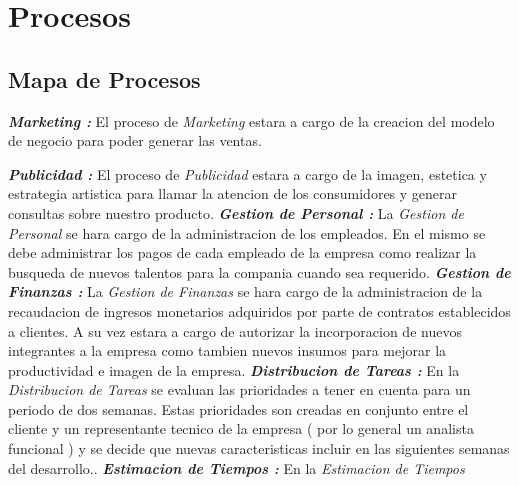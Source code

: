\documentclass[
10pt, %
a4paper, %
oneside, %
headinclude,footinclude, %
BCOR5mm, %
]{scrartcl}
\begin{document}
\section{Procesos}
\subsection{Mapa de Procesos}
  

  \begin{flushleft}
  \textbf{ \emph{Marketing : } } El proceso de \textit{Marketing} estara
  a cargo de la creacion del modelo de negocio para poder generar las ventas.

\pagebreak

  \textbf{ \emph{Publicidad : } } El proceso de \textit{Publicidad} estara
  a cargo de la imagen, estetica y estrategia artistica para llamar la atencion
  de los consumidores y generar consultas sobre nuestro producto.
   \newline \newline
  \textbf{ \emph{Gestion de Personal : } } La \textit{Gestion de Personal}
  se hara cargo de la administracion de los empleados. En el mismo se debe
  administrar los pagos de cada empleado de la empresa como realizar la busqueda
  de nuevos talentos para la compania cuando sea requerido.
   \newline \newline
  \textbf{ \emph{Gestion de Finanzas : } } La \textit{Gestion  de Finanzas} se
   hara cargo de la administracion de la recaudacion de ingresos monetarios
   adquiridos por parte de contratos establecidos a clientes. A su vez
   estara a cargo de autorizar la incorporacion de nuevos integrantes a la
   empresa como tambien nuevos insumos para mejorar la productividad e
   imagen de la empresa.
   \newline \newline
  \textbf{ \emph{Distribucion de Tareas : } } En la \textit{Distribucion de Tareas}
  se evaluan las prioridades a tener en cuenta para un periodo de dos semanas.
  Estas prioridades son creadas en conjunto entre el cliente y un representante
  tecnico de la empresa ( por lo general un analista funcional ) y se decide
  que nuevas caracteristicas incluir en las siguientes semanas del desarrollo..
  \newline  \newline
  \textbf{ \emph{Estimacion de Tiempos : } } En la \textit{Estimacion de Tiempos}

\end{flushleft}
\end{document}
